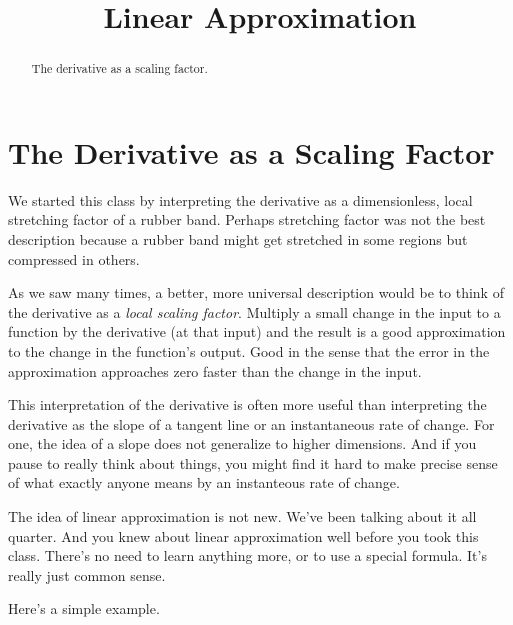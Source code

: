 \documentclass{ximera}
\title{Linear Approximation}
\begin{document}
\begin{abstract}
The derivative as a scaling factor.
\end{abstract}
\maketitle


\section{The Derivative as a Scaling Factor}

We started this class by interpreting the derivative as a dimensionless, local stretching factor of a rubber band. Perhaps stretching factor was not the best description because a rubber band might get stretched in some regions but compressed in others. 

As we saw many times, a better, more universal description would be to think of the derivative as a \emph{local scaling factor}. Multiply a small change in the input to a function by the derivative (at that input) and the result is a good approximation to the change in the function's output. Good in the sense that the error in the approximation approaches zero faster than the change in the input.

This interpretation of the derivative is often more useful than interpreting the derivative as the slope of a tangent line or an instantaneous rate of change. For one, the idea of a slope does not generalize to higher dimensions. And if you pause to really think about things, you might find it hard to make precise sense of what exactly anyone means by an instanteous rate of change. 

The idea of linear approximation is not new. We've been talking about it all quarter. And you knew about linear approximation well before you took this class. There's no need to learn anything more, or to use a special formula. It's really just common sense. 

Here's a simple example.
\end{document}
